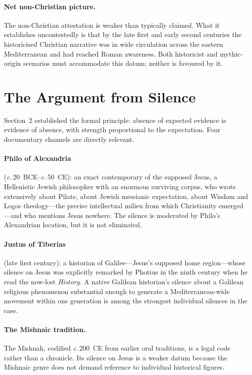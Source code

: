 \documentclass[12pt,oneside]{article}
\newcommand{\circa}{\textit{c.}\,}
\begin{document}
\paragraph{Net non-Christian picture.}
The non-Christian attestation is weaker than typically claimed.
What it establishes uncontestedly is that by the late first and
early second centuries the historicised Christian narrative was
in wide circulation across the eastern Mediterranean and had
reached Roman awareness.  Both historicist and mythic-origin
scenarios must accommodate this datum; neither is favoured by it.

\section{The Argument from Silence}

Section~2 established the formal principle: absence of expected
evidence is evidence of absence, with strength proportional to the
expectation.  Four documentary channels are directly relevant.

\paragraph{Philo of Alexandria} (\circa 20~BCE--\circa 50~CE): an
exact contemporary of the supposed Jesus, a Hellenistic Jewish
philosopher with an enormous surviving corpus, who wrote
extensively about Pilate, about Jewish messianic expectation, about
Wisdom and Logos theology---the precise intellectual milieu from
which Christianity emerged---and who mentions Jesus nowhere.  The
silence is moderated by Philo's Alexandrian location, but it is
not eliminated.

\paragraph{Justus of Tiberias} (late first century): a historian of
Galilee---Jesus's supposed home region---whose silence on Jesus
was explicitly remarked by Photius in the ninth century when he
read the now-lost \textit{History}.  A native Galilean historian's
silence about a Galilean religious phenomenon substantial enough
to generate a Mediterranean-wide movement within one generation is
among the strongest individual silences in the case.

\paragraph{The Mishnaic tradition.}
The Mishnah, codified \circa 200~CE from earlier oral traditions,
is a legal code rather than a chronicle.  Its silence on Jesus is
a weaker datum because the Mishnaic genre does not demand reference
to individual historical figures.
\end{document}
